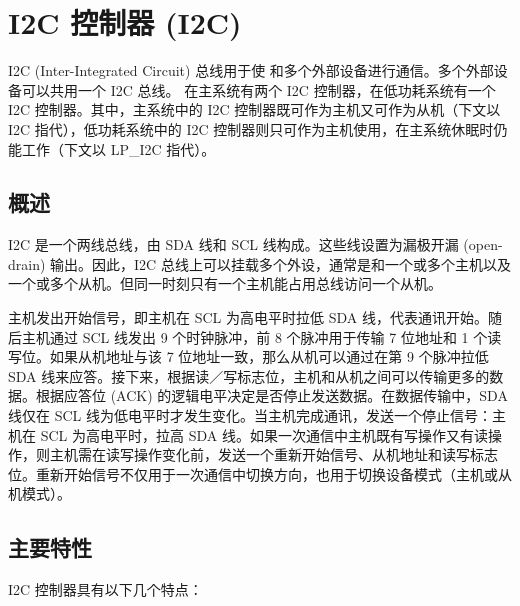 \documentclass[main\_\_CN.tex]{subfiles}
\begin{document}

\ifglobal
\else
    {\let\clearpage\relax \listoftodos}
    {\let\clearpage\relax \listofdonetodos}
    \tableofcontents
\fi



\hypertarget{i2c}{}
\chapter{I2C 控制器 (I2C)}
\label{mod:i2c}


I2C (Inter-Integrated Circuit) 总线用于使 \chipname{} 和多个外部设备进行通信。多个外部设备可以共用一个 I2C 总线。
\chipname{} 在主系统有两个 I2C 控制器，在低功耗系统有一个 I2C 控制器。其中，主系统中的 I2C 控制器既可作为主机又可作为从机（下文以 I2C 指代），低功耗系统中的 I2C 控制器则只可作为主机使用，在主系统休眠时仍能工作（下文以 LP\_I2C 指代）。


\section{概述}
I2C 是一个两线总线，由 SDA 线和 SCL 线构成。这些线设置为漏极开漏 (open-drain) 输出。因此，I2C 总线上可以挂载多个外设，通常是和一个或多个主机以及一个或多个从机。但同一时刻只有一个主机能占用总线访问一个从机。

主机发出开始信号，即主机在 SCL 为高电平时拉低 SDA 线，代表通讯开始。随后主机通过 SCL 线发出 9 个时钟脉冲，前 8 个脉冲用于传输 7 位地址和 1 个读写位。如果从机地址与该 7 位地址一致，那么从机可以通过在第 9 个脉冲拉低 SDA 线来应答。接下来，根据读／写标志位，主机和从机之间可以传输更多的数据。根据应答位 (ACK) 的逻辑电平决定是否停止发送数据。在数据传输中，SDA 线仅在 SCL 线为低电平时才发生变化。当主机完成通讯，发送一个停止信号：主机在 SCL 为高电平时，拉高 SDA 线。如果一次通信中主机既有写操作又有读操作，则主机需在读写操作变化前，发送一个重新开始信号、从机地址和读写标志位。重新开始信号不仅用于一次通信中切换方向，也用于切换设备模式（主机或从机模式）。

\section{主要特性}

\chipname{} I2C 控制器具有以下几个特点：
\end{document}
